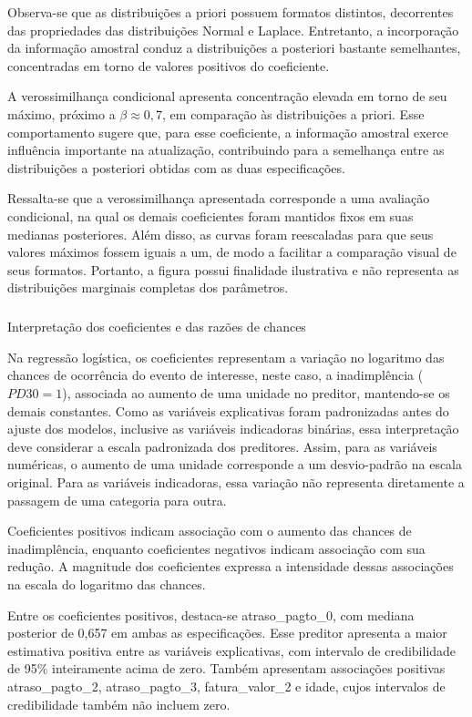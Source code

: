 \documentclass[
  brazilian,
  12pt,
  letterpaper,
  DIV=11,
  numbers=noendperiod]{scrartcl}
\makeatletter
\let\oldsubparagraph\subparagraph
\renewcommand{\subparagraph}{
    \@ifstar
      \xxxSubParagraphStar
      \xxxSubParagraphNoStar
  }
\newcommand{\xxxSubParagraphStar}[1]{\oldsubparagraph*{#1}\mbox{}}
\newcommand{\xxxSubParagraphNoStar}[1]{\oldsubparagraph{#1}\mbox{}}
\makeatother
\begin{document}
Observa-se que as distribuições a priori possuem formatos distintos,
decorrentes das propriedades das distribuições Normal e Laplace.
Entretanto, a incorporação da informação amostral conduz a distribuições
a posteriori bastante semelhantes, concentradas em torno de valores
positivos do coeficiente.

A verossimilhança condicional apresenta concentração elevada em torno de
seu máximo, próximo a \(\beta \approx 0{,}7\), em comparação às
distribuições a priori. Esse comportamento sugere que, para esse
coeficiente, a informação amostral exerce influência importante na
atualização, contribuindo para a semelhança entre as distribuições a
posteriori obtidas com as duas especificações.

Ressalta-se que a verossimilhança apresentada corresponde a uma
avaliação condicional, na qual os demais coeficientes foram mantidos
fixos em suas medianas posteriores. Além disso, as curvas foram
reescaladas para que seus valores máximos fossem iguais a um, de modo a
facilitar a comparação visual de seus formatos. Portanto, a figura
possui finalidade ilustrativa e não representa as distribuições
marginais completas dos parâmetros.

\subparagraph{Interpretação dos coeficientes e das razões de
chances}\label{interpretauxe7uxe3o-dos-coeficientes-e-das-razuxf5es-de-chances}

Na regressão logística, os coeficientes representam a variação no
logaritmo das chances de ocorrência do evento de interesse, neste caso,
a inadimplência (\(PD30 = 1\)), associada ao aumento de uma unidade no
preditor, mantendo-se os demais constantes. Como as variáveis
explicativas foram padronizadas antes do ajuste dos modelos, inclusive
as variáveis indicadoras binárias, essa interpretação deve considerar a
escala padronizada dos preditores. Assim, para as variáveis numéricas, o
aumento de uma unidade corresponde a um desvio-padrão na escala
original. Para as variáveis indicadoras, essa variação não representa
diretamente a passagem de uma categoria para outra.

Coeficientes positivos indicam associação com o aumento das chances de
inadimplência, enquanto coeficientes negativos indicam associação com
sua redução. A magnitude dos coeficientes expressa a intensidade dessas
associações na escala do logaritmo das chances.

Entre os coeficientes positivos, destaca-se atraso\_pagto\_0, com
mediana posterior de 0,657 em ambas as especificações. Esse preditor
apresenta a maior estimativa positiva entre as variáveis explicativas,
com intervalo de credibilidade de 95\% inteiramente acima de zero.
Também apresentam associações positivas atraso\_pagto\_2,
atraso\_pagto\_3, fatura\_valor\_2 e idade, cujos intervalos de
credibilidade também não incluem zero.
\end{document}

